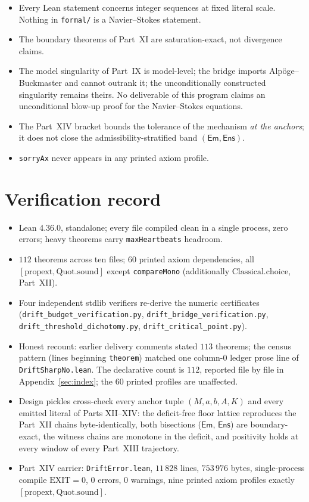 \documentclass[11pt]{article}
\theoremstyle{plain}
\theoremstyle{definition}
\begin{document}
\begin{itemize}
\item Every Lean statement concerns integer sequences at fixed literal scale. Nothing in
\texttt{formal/} is a Navier--Stokes statement.
\item The boundary theorems of Part~XI are saturation-exact, not divergence claims.
\item The model singularity of Part~IX is model-level; the bridge imports
Alp\"oge--Buckmaster \cite{blowup} and cannot outrank it; the unconditionally constructed
singularity remains theirs. No deliverable of this program claims an unconditional
blow-up proof for the Navier--Stokes equations.
\item The Part~XIV bracket bounds the tolerance of the mechanism \emph{at the anchors};
it does not close the admissibility-stratified band $(\mathsf{Em},\mathsf{Ens})$.
\item \texttt{sorryAx} never appears in any printed axiom profile.
\end{itemize}

\section{Verification record}\label{sec:record}

\begin{itemize}
\item Lean 4.36.0, standalone; every file compiled clean in a single process, zero errors;
heavy theorems carry \texttt{maxHeartbeats} headroom.
\item $112$ theorems across ten files; $60$ printed axiom dependencies, all
$[\mathrm{propext},\mathrm{Quot.sound}]$ except \texttt{compareMono}
(additionally $\mathrm{Classical.choice}$, Part~XII).
\item Four independent stdlib verifiers re-derive the numeric certificates
(\texttt{drift\_budget\_verification.py}, \texttt{drift\_bridge\_verification.py},
\texttt{drift\_threshold\_dichotomy.py}, \texttt{drift\_critical\_point.py}).
\item Honest recount: earlier delivery comments stated $113$ theorems; the census
pattern (lines beginning \texttt{theorem}) matched one column-0 ledger prose line of
\texttt{DriftSharpNo.lean}. The declarative count is $112$, reported file by file in
Appendix~\ref{sec:index}; the $60$ printed profiles are unaffected.
\item Design pickles cross-check every anchor tuple $(M,a,b,A,K)$ and every emitted literal
of Parts XII--XIV: the deficit-free floor lattice reproduces the Part~XII chains
byte-identically, both bisections ($\mathsf{Em}$, $\mathsf{Ens}$) are boundary-exact, the
witness chains are monotone in the deficit, and positivity holds at every window of every
Part~XIII trajectory.
\item Part~XIV carrier: \texttt{DriftError.lean}, $11\,828$ lines, $753\,976$ bytes,
single-process compile $\mathrm{EXIT}=0$, $0$ errors, $0$ warnings, nine printed axiom
profiles exactly $[\mathrm{propext},\mathrm{Quot.sound}]$.
\end{itemize}
\end{document}
